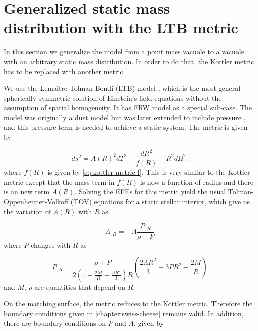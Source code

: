 \chapter{Generalized static mass distribution with the LTB metric}
\label{appendix:ltb}

In this section we generalize the model from a point mass vacuole to a vacuole with an arbitrary static mass distribution. In order to do that, the Kottler metric has to be replaced with another metric. 

We use the Lema\^itre-Tolman-Bondi (LTB) model \citep{tolman1934effect,bondi1947spherically,lemaitre1933expansion}, which is the most general spherically symmetric solution of Einstein`s field equations without the assumption of spatial homogeneity. It has FRW model as a special sub-case. The model was originally a dust model but was later extended to include pressure \citep{lasky2006generalized}, and this pressure term is needed to achieve a static system. The metric is given by

\begin{equation}
  ds^2 = A(R)^2 dT^2 - \frac{dR^2}{f(R)} - R^2 d \Omega^2.
  \label{eq:ltb-metric}
\end{equation}
where $f(R)$ is given by \autoref{eq:kottler-metric-f}. This is very similar to the Kottler metric except that the mass term in $f(R)$ is now a function of radius and there is an new term $A(R)$. Solving the EFEs for this metric yield the usual Tolman-Oppenheimer-Volkoff (TOV) equations \citep{tolman1939static,oppenheimer1939massive} for a static stellar interior, which give us the variation of $A(R)$ with $R$ as

\begin{equation}
  A_{,R} = - A \frac{P_{,R}}{\rho + P}
  \label{eq:alpha-evolution}
\end{equation}
where $P$ changes with $R$ as

\begin{equation}
  P_{,R} = \frac{\rho + P}{2\left (1- \frac{2M}{R} - \frac{\Lambda R^2}{3}\right )R}
  \left (\frac{2 \Lambda R^2}{3}  -3PR^2 -\frac{2M}{R} \right ) 
  \label{eq:pressure-P-evolution}
\end{equation}
and $M$, $\rho$ are quantities that depend on $R$. 


On the matching surface, the metric reduces to the Kottler metric. Therefore the boundary conditions given in \autoref{chapter:swiss-cheese} remains valid. In addition, there are boundary conditions on $P$ and $A$, given by

